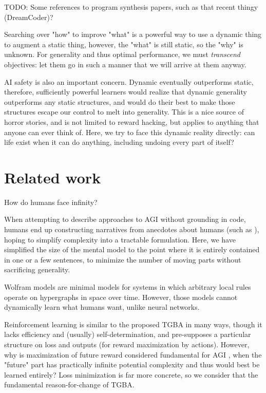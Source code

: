 \documentclass{article}
\begin{document}
        TODO: Some references to program synthesis papers, such as that recent thingy (DreamCoder)?

Searching over "how" to improve "what" is a powerful way to use a dynamic thing to augment a static thing, however, the "what" is still static, so the "why" is unknown. For generality and thus optimal performance, we must \textit{transcend} objectives: let them go in such a manner that we will arrive at them anyway.

AI safety is also an important concern. Dynamic eventually outperforms static, therefore, sufficiently powerful learners would realize that dynamic generality outperforms any static structures, and would do their best to make those structures escape our control to melt into generality. This is a nice source of horror stories, and is not limited to reward hacking, but applies to anything that anyone can ever think of. Here, we try to face this dynamic reality directly: can life exist when it can do anything, including undoing every part of itself?

\section{Related work}

How do humans face infinity?

When attempting to describe approaches to AGI without grounding in code, humans end up constructing narratives from anecdotes about humans (such as \cite{DBLP:journals/corr/abs-2102-03406}), hoping to simplify complexity into a tractable formulation. Here, we have simplified the size of the mental model to the point where it is entirely contained in one or a few sentences, to minimize the number of moving parts without sacrificing generality.

Wolfram models \cite{Wolfram_2020} are minimal models for systems in which arbitrary local rules operate on hypergraphs in space over time. However, those models cannot dynamically learn what humans want, unlike neural networks.

Reinforcement learning is similar to the proposed TGBA in many ways, though it lacks efficiency and (usually) self-determination, and pre-supposes a particular structure on loss and outputs (for reward maximization by actions). However, why is maximization of future reward considered fundamental for AGI \cite{SILVER2021103535}, when the "future" part has practically infinite potential complexity and thus would best be learned entirely? Loss minimization is far more concrete, so we consider that the fundamental reason-for-change of TGBA.
\end{document}
